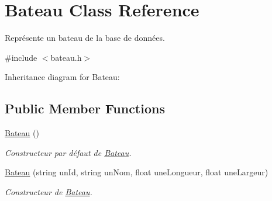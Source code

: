\hypertarget{class_bateau}{\section{Bateau Class Reference}
\label{class_bateau}
}


Représente un bateau de la base de données.  




{\ttfamily \#include $<$bateau.\-h$>$}



Inheritance diagram for Bateau\-:
\subsection*{Public Member Functions}
\begin{DoxyCompactItemize}
\item 
\hypertarget{class_bateau_a9b2027f6f3a71d6b05209e22b928db00}{\hyperlink{class_bateau_a9b2027f6f3a71d6b05209e22b928db00}{Bateau} ()}\label{class_bateau_a9b2027f6f3a71d6b05209e22b928db00}

\begin{DoxyCompactList}\small\item\em Constructeur par défaut de \hyperlink{class_bateau}{Bateau}. \end{DoxyCompactList}\item 
\hyperlink{class_bateau_a7f4786df5c5ab3e10b34d2553ea3a5e1}{Bateau} (string un\-Id, string un\-Nom, float une\-Longueur, float une\-Largeur)
\begin{DoxyCompactList}\small\item\em Constructeur de \hyperlink{class_bateau}{Bateau}. \end{DoxyCompactList}\end{DoxyCompactItemize}
